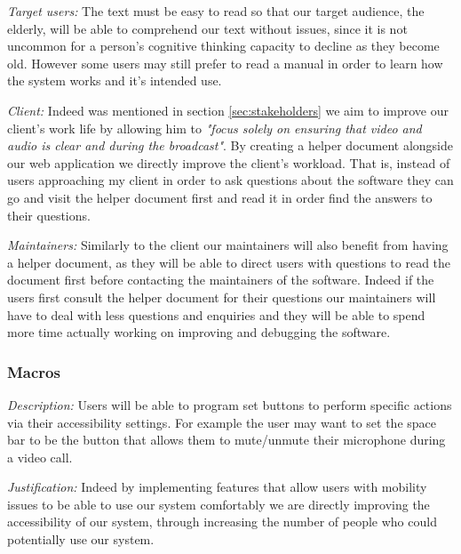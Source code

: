 \textit{Target users:}
The text must be easy to read so that our target
audience, the elderly, will be able to comprehend our text
without issues, since it is not uncommon for a person's
cognitive thinking capacity to decline as they become old.
However some users may still prefer to read a manual in
order to learn how the system works and it's intended use.
\\ \vspace{0.2cm}

\textit{Client:}
Indeed was mentioned in section \ref{sec:stakeholders}
we aim to improve our client's work life by allowing
him to \textit{"focus solely on ensuring that video
and audio is clear and during the broadcast"}. By creating
a helper document alongside our web application we directly
improve the client's workload. That is, instead of users
approaching my client in order to ask questions about the
software they can go and visit the helper document first
and read it in order find the answers to their questions.
\\ \vspace{0.2cm}

\textit{Maintainers:}
Similarly to the client our maintainers will also benefit
from having a helper document, as they will be able to
direct users with questions to read the document first
before contacting the maintainers of the software. Indeed
if the users first consult the helper document for their
questions our maintainers will have to deal with less
questions and enquiries and they will be able to spend more
time actually working on improving and debugging the software.
\\ \vspace{0.2cm}

\subsubsection{Macros}

\textit{Description:}
Users will be able to program set buttons to perform
specific actions via their accessibility settings. For
example the user may want to set the space bar to be the
button that allows them to mute/unmute their microphone
during a video call. \\ \vspace{0.2cm}

\textit{Justification:}
Indeed by implementing features that allow users with
mobility issues to be able to use our system comfortably we
are directly improving the accessibility of our system,
through increasing the number of people who could potentially
use our system. \\ \vspace{0.2cm}

